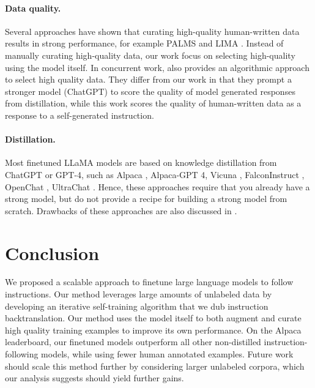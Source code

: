 \vspace{-2mm}

\paragraph{Data quality.}

Several approaches have shown that curating high-quality human-written data results in strong performance, for example PALMS \citep{solaiman2021process} and
LIMA \citep{zhou2023lima}. Instead of manually curating high-quality data, our work focus on selecting high-quality using the model itself. In concurrent work, \cite{chen2023alpagasus} also provides an algorithmic approach to select high quality data. They differ from our work in that they prompt a stronger model (ChatGPT) to score the quality of model generated responses from distillation, while this work scores the quality of human-written data as a response to a self-generated instruction. 

\paragraph{Distillation.} Most finetuned LLaMA models are based on knowledge distillation from ChatGPT or GPT-4, such as Alpaca \citep{alpaca}, Alpaca-GPT 4\citep{peng2023instruction}, Vicuna \citep{vicuna2023}, FalconInstruct \citep{falcon40b}, OpenChat \citep{openchat}, UltraChat \citep{ding2023enhancing}. 
Hence, these approaches require that you already have a strong model, but do not provide a recipe for building a strong model from scratch.
Drawbacks of these approaches are also discussed in \cite{gudibande2023false}.
\section{Conclusion}
We proposed a scalable approach to finetune large language models to follow instructions. Our method leverages large amounts of unlabeled data by developing an iterative self-training algorithm that we dub instruction backtranslation. Our method uses the model itself to both augment  and curate
high quality training examples to improve its own performance. On the Alpaca leaderboard, our finetuned models outperform all other non-distilled instruction-following models, while using fewer human annotated examples.
Future work should scale this method further by considering larger unlabeled corpora, which our analysis suggests should  yield further gains.\newpage

\newpage

